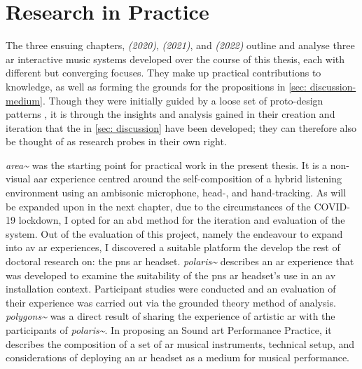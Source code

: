 \section{Research in Practice}
The three ensuing chapters, \textit{ (2020)}, \textit{ (2021)}, and \textit{ (2022)} outline and analyse three \gls{ar} interactive music systems developed over the course of this thesis, each with different but converging focuses. They make up practical contributions to knowledge, as well as forming the grounds for the propositions in \autoref{sec: discussion-medium}. Though they were initially guided by a loose set of proto-design patterns \citep{bilbow2020}, it is through the insights and analysis gained in their creation and iteration that the  in \autoref{sec: discussion} have been developed; they can therefore also be thought of as research probes in their own right.

\textit{area\textasciitilde{}} was the starting point for practical work in the present thesis. It is a non-visual \gls{aar} experience centred around the self-composition of a hybrid listening environment using an ambisonic microphone, head-, and hand-tracking. As will be expanded upon in the next chapter, due to the circumstances of the COVID-19 lockdown, I opted for an \gls{abd} method for the iteration and evaluation of the system. Out of the evaluation of this project, namely the endeavour to expand into \gls{av} \gls{ar} experiences, I discovered a suitable platform the develop the rest of doctoral research on: the  \gls{pns} \gls{ar} headset. \textit{polaris\textasciitilde{}} describes an \gls{ar} experience that was developed to examine the suitability of the \gls{pns} \gls{ar} headset's use in an \gls{av} installation context. Participant studies were conducted and an evaluation of their experience was carried out via the grounded theory method of analysis. \textit{polygons\textasciitilde{}} was a direct result of sharing the experience of artistic \gls{ar} with the participants of \textit{polaris\textasciitilde{}}. In proposing an Sound \gls{art} Performance Practice, it describes the composition of a set of \gls{ar} musical instruments, technical setup, and considerations of deploying an \gls{ar} headset as a medium for musical performance.


